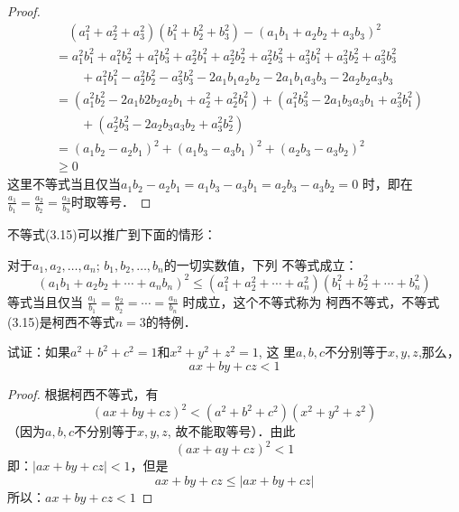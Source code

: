 \begin{proof}
    \[\begin{split}
&\quad   (a_1^2+a_2^2+a_3^2)(b_1^2+b_2^2+b_3^2)-(a_1b_1+a_2b_2+a_3b_3)^2\\
 & = a_1^2b_1^2+a_1^2b_2^2+a_1^2b_3^2
    +a_2^2b_1^2+a_2^2b_2^2+a_2^2b_3^2
    +a_3^2b_1^2+a_3^2b_2^2+a_3^2b_3^2\\
  &\qquad  + a_1^2b_1^2-a_2^2b^2_2-a_3^2b_3^2
    -2a_1b_1a_2b_2-2a_1b_1a_3b_3-2a_2b_2a_3b_3\\
    & = (a_1^2b_2^2-2a_1b2b_2a_2b_1+a_2^2+a_2^2b_1^2)
    +(a_1^2b_3^2-2a_1b_3a_3b_1+a_3^2b_1^2)\\
    &\qquad     +(a_2^2b_3^2-2a_2b_3a_3b_2+a_3^2b_2^2)\\
    & = (a_1b_2 -a_2b_1)^2+(a_1b_3-a_3b_1)^2+(a_2b_3-a_3b_2)^2\\
    & \ge 0        
    \end{split}\]
    这里不等式当且仅当$a_1b_2 -a_2b_1=a_1b_3-a_3b_1=a_2b_3-a_3b_2=0$   
    时，即在$\frac{a_1}{b_1}=\frac{a_2}{b_2}=\frac{a_3}{b_3}$时取等号． 
\end{proof}

不等式(3.15)可以推广到下面的情形：

\begin{blk}{}
    对于$a_1,a_2,\ldots,a_n$; $b_1,b_2,\ldots,b_n$的一切实数值，下列
    不等式成立：
    \[(a_1b_1+a_2b_2+\cdots+a_nb_n)^2\le (a_1^2+a_2^2+\cdots+a_n^2)(b_1^2+b_2^2+\cdots+b_n^2)\]
    等式当且仅当
    $\frac{a_1}{b_1}=\frac{a_2}{b_2}=\cdots=\frac{a_n}{b_n}$
    时成立，这个不等式称为
    柯西不等式，不等式(3.15)是柯西不等式$n=3$的特例．
\end{blk}



\begin{example}
    试证：如果$a^2+b^2+c^2=1$和$x^2+y^2+z^2=1$, 这
里$a,b,c$不分别等于$x,y,z$,那么，
\[ax+by+cz<1\]
\end{example}

\begin{proof}
根据柯西不等式，有
\[(ax+by+cz)^2<(a^2+b^2+c^2)(x^2+y^2+z^2)\]
（因为$a,b,c$不分别等于$x,y,z$, 故不能取等号）．由此
\[(ax+ay+cz)^2<1\]
即：$|ax+by+cz|<1$，但是
\[ax+by+cz\le |ax+by+cz|\]
所以：$ax+by+cz<1$
\end{proof}

